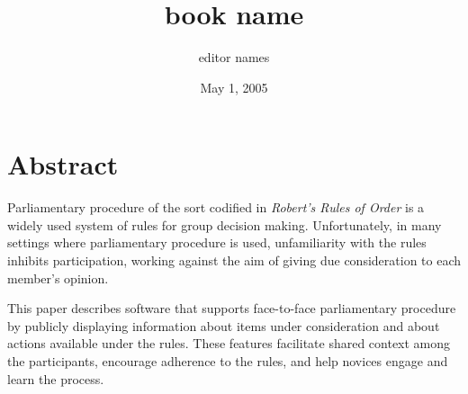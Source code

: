 \documentclass{book}
\begin{document}

\title{book name}
\author{editor names}





\date{May 1, 2005}

\maketitle
{}

\section*{Abstract}
Parliamentary procedure of the sort codified in \emph{Robert's Rules of Order}
is a widely used system of rules for group decision making.
Unfortunately, in many settings where parliamentary procedure is used,
unfamiliarity with the rules inhibits participation,
working against the aim of giving due consideration to each member's opinion. 

This paper describes software that
supports face-to-face parliamentary procedure
by publicly displaying information about items under consideration
and about actions available under the rules.
These features facilitate shared context among the participants,
encourage adherence to the rules, and
help novices engage and learn the process.
\end{document}
